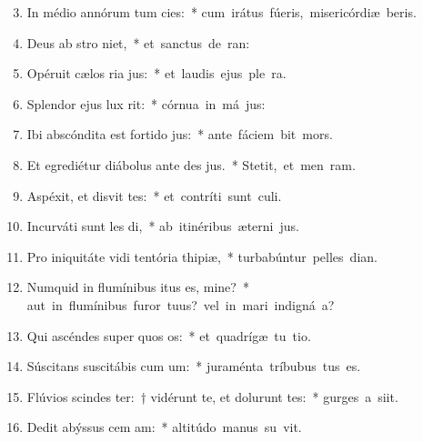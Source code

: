 \begin{flushleft}
\begin{enumerate}[leftmargin=*]
\setcounter{enumi}{2}

\item In médio annórum tum cies:~* \mbox{cum irátus fúeris, misericórdiæ beris.}
\item Deus ab stro niet,~* \mbox{et sanctus de  ran:}
\item Opéruit cælos ria jus:~* \mbox{et laudis ejus ple  ra.}
\item Splendor ejus  lux rit:~* \mbox{córnua in má jus:}
\item Ibi abscóndita est fortido jus:~* \mbox{ante fáciem  bit mors.}
\item Et egrediétur diábolus ante des jus.~* \mbox{Stetit, et men  ram.}
\item Aspéxit, et disvit tes:~* \mbox{et contríti sunt  culi.}
\item Incurváti sunt les di,~* \mbox{ab itinéribus æterni jus.}
\item Pro iniquitáte vidi tentória thipiæ,~* \mbox{turbabúntur pelles  dian.}
\item Numquid in flumínibus itus es, mine?~* \mbox{aut in flumínibus furor tuus? vel in mari indigná a?}
\item Qui ascéndes super quos os:~* \mbox{et quadrígæ tu tio.}
\item Súscitans suscitábis cum um:~* \mbox{juraménta tríbubus  tus es.}
\item Flúvios scindes ter:~† vidérunt te, et dolurunt tes:~* \mbox{gurges a siit.}
\item Dedit abýssus cem am:~* \mbox{altitúdo manus su vit.}

\end{enumerate}
\end{flushleft}

